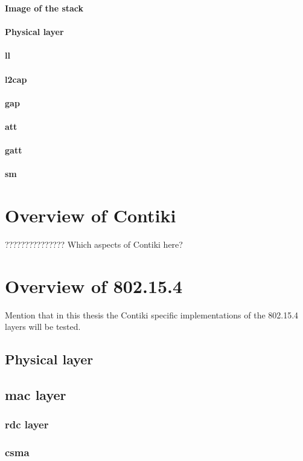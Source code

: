 \textbf{Image of the stack}

\paragraph{Physical layer}
\paragraph{\acrfull{ll}}
\paragraph{\gls{l2cap}}
\paragraph{\gls{gap}}
\paragraph{\gls{att}}
\paragraph{\gls{gatt}}
\paragraph{\gls{sm}}

\section{Overview of Contiki}
??????????????? Which aspects of Contiki here?

\section{Overview of 802.15.4}
Mention that in this thesis the Contiki specific implementations of the 802.15.4 layers will be tested.

\subsection{Physical layer}

\subsection{\gls{mac} layer}
\subsubsection{\gls{rdc} layer}
\subsubsection{\gls{csma}}


